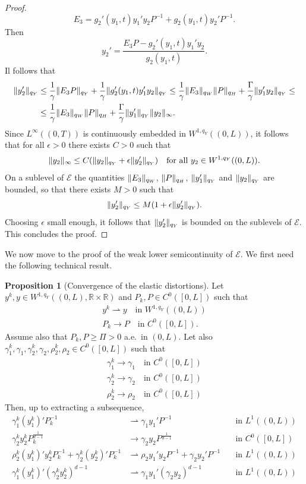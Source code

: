 \documentclass[a4paper,10pt,oneside]{amsbook}
\numberwithin{section}{chapter}
\numberwithin{equation}{chapter}
\theoremstyle{definition}
\newtheorem{prop}{Proposition}[chapter]
\DeclarePairedDelimiter{\norm}{\lVert}{\rVert}
\begin{document}
\begin{proof}
\[
E_3=g_2'(y_1,t)y_1'y_2P^{-1}+g_2(y_1,t)y_2'P^{-1}.
\]
Then
\[
y_2'=\frac{E_3P-g_2'(y_1,t)y_1'y_2}{g_2(y_1,t)}.
\]
Il follows that
\[
\begin{split}
\norm{y_2'}_{q_Y}&\le\frac{1}{\gamma}\norm{E_3P}_{q_Y}+\frac{1}{\gamma}\norm{g_2'(y_1,t)y_1'y_2}_{q_Y}\le\frac{1}{\gamma}\norm{E_3}_{q_W}\norm{P}_{q_H}+\frac{\Gamma}{\gamma}\norm{y_1'y_2}_{q_Y}\le\\
&\le\frac{1}{\gamma}\norm{E_3}_{q_W}\norm{P}_{q_H}+\frac{\Gamma}{\gamma}\norm{y_1'}_{q_Y}\norm{y_2}_\infty.
\end{split}
\]
Since $L^\infty((0,T))$ is continuously embedded in $W^{1,q_Y}((0,L))$, it follows that for all $\epsilon>0$ there exists $C>0$ such that
\[
\norm{y_2}_\infty\le C(\norm{y_2}_{q_Y}+\epsilon\norm{y_2'}_{q_Y})\quad\text{for all $y_2\in W^{1,{q_Y}}((0,L))$}.
\]
On a sublevel of $\mathcal{E}$ the quantities $\norm{E_3}_{q_W}$, $\norm{P}_{q_H}$, $\norm{y_1'}_{q_Y}$ and $\norm{y_2}_{q_Y}$ are bounded, so that there exists $M>0$ such that
\[
\norm{y_2'}_{q_Y}\le M(1+\epsilon\norm{y_2'}_{q_Y}).
\]
Choosing $\epsilon$ small enough, it follows that $\norm{y_2'}_{q_Y}$ is bounded on the sublevels of $\mathcal{E}$. This concludes the proof.
\end{proof}
We now move to the proof of the weak lower semicontinuity of $\mathcal E$. We first need the following technical result.
\begin{prop}[Convergence of the elastic distortions]
\label{prop:convergence-minors}
Let $y^k,y\in W^{1,q_Y}((0,L),\mathbb{R}\times\mathbb{R})$ and $P_k,P\in C^0([0,L])$ such that
\begin{gather*}
y^k\rightharpoonup y\quad\text{in $W^{1,q_Y}((0,L))$} \\
P_k\to P\quad\text{in $C^0([0,L])$}.
\end{gather*}
Assume also that $P_k,P\ge \Pi>0$ a.e.\ in $(0,L)$. Let also $\gamma_1^k,\gamma_1,\gamma_2^k,\gamma_2,\rho_2^k,\rho_2\in C^0([0,L])$ such that
\begin{align*}
\gamma_1^k\to\gamma_1\quad\text{in $C^0([0,L])$} \\
\gamma_2^k\to\gamma_2\quad\text{in $C^0([0,L])$} \\
\rho_2^k\to\rho_2\quad\text{in $C^0([0,L])$}
\end{align*}
Then, up to extracting a subsequence,
\begin{align*}
\gamma_1^k(y_1^k)'P_k^{-1}&\rightharpoonup \gamma_1y_1'P^{-1}\quad&\text{in $L^1((0,L))$} \\
\gamma_2^ky_2^kP_k^\frac{1}{d-1}&\to \gamma_2y_2P^\frac{1}{d-1}\quad&\text{in $C^0([0,L])$} \\
\rho_2^k(y_1^k)'y_2^kP_k^{-1}+\gamma_2^k(y_2^k)'P_k^{-1}&\rightharpoonup \rho_2y_1'y_2P^{-1}+\gamma_2y_2'P^{-1}\quad&\text{in $L^1((0,L))$} \\
\gamma_1^k(y_1^k)'(\gamma_2^ky_2^k)^{d-1}&\rightharpoonup \gamma_1y_1'(\gamma_2y_2)^{d-1}\quad&\text{in $L^1((0,L))$}
\end{align*}
\end{prop}
\end{document}

